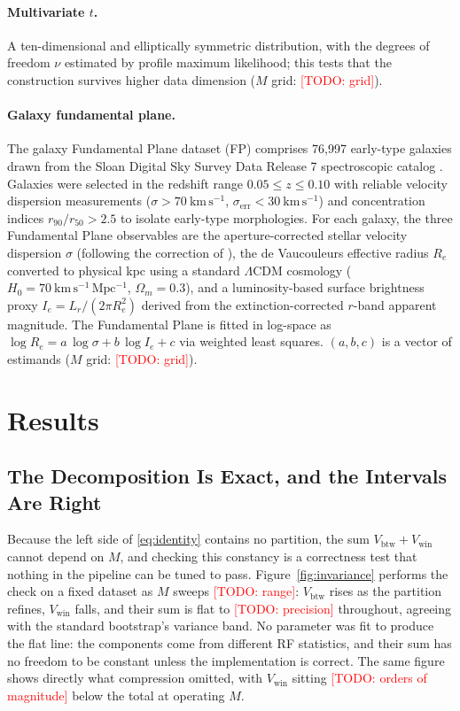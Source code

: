 \documentclass[runningheads]{llncs}
\newcommand{\todo}[1]{\textcolor{red}{[TODO: #1]}}
\newcommand{\Vcell}{V_{\mathrm{btw}}}
\newcommand{\Vwithin}{V_{\mathrm{win}}}
\begin{document}
\paragraph{Multivariate $t$.} A ten-dimensional and elliptically symmetric distribution, with the degrees of freedom $\nu$ estimated by profile maximum likelihood; this tests that the construction survives higher data dimension ($M$ grid: \todo{grid}).

\paragraph{Galaxy fundamental plane.} The galaxy Fundamental Plane dataset (FP) comprises 76{,}997 early-type galaxies drawn from the Sloan Digital Sky Survey Data Release 7 spectroscopic catalog \cite{abazajian2009}. Galaxies were selected in the redshift range $0.05 \le z \le 0.10$ with reliable velocity dispersion measurements ($\sigma > 70~\mathrm{km\,s^{-1}}$, $\sigma_{\mathrm{err}} < 30~\mathrm{km\,s^{-1}}$) and concentration indices $r_{90}/r_{50} > 2.5$ to isolate early-type morphologies. For each galaxy, the three Fundamental Plane observables are the aperture-corrected stellar velocity dispersion $\sigma$ (following the correction of \cite{jorgensen1995}), the de Vaucouleurs effective radius $R_e$ converted to physical kpc using a standard $\Lambda$CDM cosmology ($H_0 = 70~\mathrm{km\,s^{-1}\,Mpc^{-1}}$, $\Omega_m = 0.3$), and a luminosity-based surface brightness proxy $I_e = L_r/(2\pi R_e^2)$ derived from the extinction-corrected $r$-band apparent magnitude. The Fundamental Plane is fitted in log-space as $\log R_e = a\,\log\sigma + b\,\log I_e + c$ via weighted least squares. $(a,b,c)$ is a vector of estimands ($M$ grid: \todo{grid}).


\section{Results}\label{sec:results}

\subsection{The Decomposition Is Exact, and the Intervals Are Right}\label{sec:res-valid}

Because the left side of \eqref{eq:identity} contains no partition, the sum $\Vcell + \Vwithin$ cannot depend on $M$, and checking this constancy is a correctness test that nothing in the pipeline can be tuned to pass. Figure~\ref{fig:invariance} performs the check on a fixed dataset as $M$ sweeps \todo{range}: $\Vcell$ rises as the partition refines, $\Vwithin$ falls, and their sum is flat to \todo{precision} throughout, agreeing with the standard bootstrap's variance band. No parameter was fit to produce the flat line: the components come from different RF statistics, and their sum has no freedom to be constant unless the implementation is correct. The same figure shows directly what compression omitted, with $\Vwithin$ sitting \todo{orders of magnitude} below the total at operating $M$.
\end{document}
